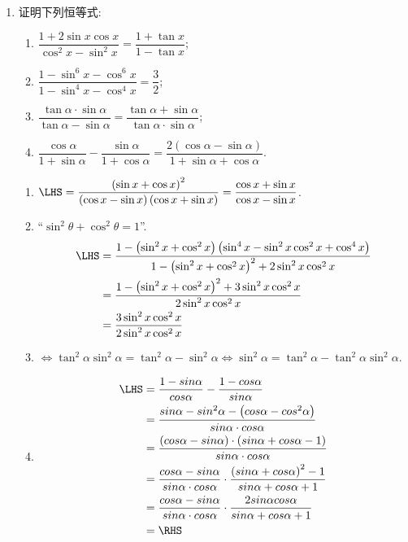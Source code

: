 \begin{enumerate}
\item 证明下列恒等式: 
\begin{enumerate}[(1)]
\item $\dfrac{1+2\sin{x}\cos{x}}{\cos^2x-\sin^2x}=\dfrac{1+\tan{x}}{1-\tan{x}}$; 
\item $\dfrac{1-\sin^6x-\cos^6x}{1-\sin^4x-\cos^4x}=\dfrac{3}{2}$;
\item $\dfrac{\tan\alpha\cdot\sin\alpha}{\tan\alpha-\sin\alpha}=\dfrac{\tan\alpha+\sin\alpha}{\tan\alpha\cdot\sin\alpha}$; 
\item $\dfrac{\cos\alpha}{1+\sin\alpha}-\dfrac{\sin\alpha}{1+\cos\alpha}=\dfrac{2\left(\cos\alpha-\sin\alpha\right)}{1+\sin\alpha+\cos\alpha}$. 
\end{enumerate}
\begin{jieda}
\begin{enumerate}[(1)]
\item $\LHS=\dfrac{\left(\sin{x}+\cos{x}\right)^2}{\left(\cos{x}-\sin{x}\right)\left(\cos{x}+\sin{x}\right)}=\dfrac{\cos{x}+\sin{x}}{\cos{x}-\sin{x}}$. 

\item ``$\sin^2\theta+\cos^2\theta=1$''. 
\begin{align*}
\LHS & = \dfrac{1-\left(\sin^2x+\cos^2x\right)\left(\sin^4x-\sin^2x\cos^2x+\cos^4x\right)}{1-\left(\sin^2x+\cos^2x\right)^2+2\sin^2x\cos^2x}\\
& = \dfrac{1-\left(\sin^2x+\cos^2x\right)^2+3\sin^2x\cos^2x}{2\sin^2x\cos^2x}\\
& = \dfrac{3\sin^2x\cos^2x}{2\sin^2x\cos^2x}
\end{align*}

\item $\iff\tan^2\alpha\sin^2\alpha=\tan^2\alpha-\sin^2\alpha\iff\sin^2\alpha=\tan^2\alpha-\tan^2\alpha\sin^2\alpha$. 

\item 
\begin{align*}
\LHS & = \dfrac{1-sin\alpha}{cos\alpha} - \dfrac{1-cos\alpha}{sin\alpha} \\
& = \dfrac{sin\alpha - sin^2\alpha - \left(cos\alpha - cos^2\alpha\right)}{sin\alpha \cdot cos\alpha} \\
& = \dfrac{\left(cos\alpha - sin\alpha\right) \cdot \left(sin\alpha + cos\alpha - 1\right)}{sin\alpha \cdot cos\alpha} \\
& = \dfrac{cos\alpha - sin\alpha}{sin\alpha \cdot cos\alpha} \cdot \dfrac{\left(sin\alpha + cos\alpha\right)^2 - 1}{sin\alpha + cos\alpha + 1} \\
& = \dfrac{cos\alpha - sin\alpha}{sin\alpha \cdot cos\alpha} \cdot \dfrac{2sin\alpha cos\alpha}{sin\alpha + cos\alpha + 1} \\
& = \RHS
\end{align*}
\end{enumerate}
\end{jieda}



\end{enumerate}
